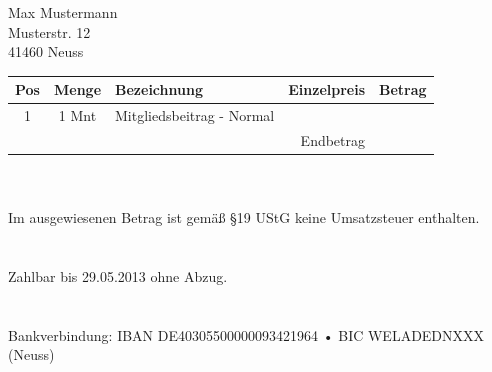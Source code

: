 \documentclass[backaddress=true,fromlogo=true]{scrlttr2}
\newcommand{\fnordname}{Max Mustermann}
\newcommand{\fnordstrasse}{Musterstr. 12}
\newcommand{\fnordort}{41460 Neuss}
\newcommand{\fnordpositionen}{1 & 1 Mnt & Mitgliedsbeitrag - Normal & \EUR{10,00} & \EUR{10,00}\\\hline}
\newcommand{\fnordendbetrag}{\EUR{10,00}}
\newcommand{\fnordzahldatum}{29.05.2013}
\begin{document}
\setlength{\parindent}{0pt}

\begin{letter}{
  \fnordname\\
  \fnordstrasse\\
  \fnordort
}
\opening{}
\renewcommand{\arraystretch}{1.3}
\baselineskip=12pt
\begin{tabular*}{\textwidth}{ccp{}rr}
 \textbf{Pos} & \textbf{Menge} & \textbf{Bezeichnung} & \textbf{Einzelpreis} & \textbf{Betrag} \\
 \hline
 \fnordpositionen
 \multicolumn{4}{r}{\rule{0pt}{4ex}Endbetrag} & \fnordendbetrag\\
\end{tabular*}
\\
\\
{\footnotesize Im ausgewiesenen Betrag ist gemäß §19 UStG keine Umsatzsteuer enthalten.} \\
\\[\baselineskip]
\\
Zahlbar bis {\fnordzahldatum} ohne Abzug. \\
\\
\\
Bankverbindung: IBAN DE40305500000093421964  • BIC WELADEDNXXX (Neuss)
\end{letter}
\end{document}
